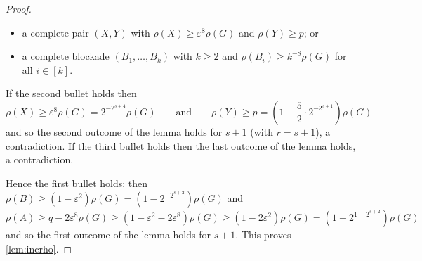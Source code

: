 \documentclass[10pt,a4paper]{amsart}
\newcommand{\eps}{\varepsilon}
\begin{document}
\begin{proof}
\begin{itemize}
			\item a complete pair $(X,Y)$ with $\rho(X)\ge \eps^8\rho(G)$ and $\rho(Y)\ge p$; or
			
			\item a complete blockade $(B_1,\ldots,B_k)$ with $k\ge2$ and $\rho(B_i)\ge k^{-8}\rho(G)$ for all $i\in[k]$.
		\end{itemize}
		
		If the second bullet holds then \[\rho(X)\ge\eps^8\rho(G)=2^{-2^{s+4}}\rho(G)
		\qquad\text{and}\qquad
		\rho(Y)\ge p=\left(1-\frac52\cdot 2^{-2^{s+1}}\right)\rho(G)\]
		and so the second outcome of the lemma holds for $s+1$ (with $r=s+1$), a contradiction.
		If the third bullet holds then the last outcome of the lemma holds, a contradiction.
		
		Hence the first bullet holds; then $\rho(B)\ge(1-\eps^2)\rho(G)=(1-2^{-2^{s+2}})\rho(G)$ and
		\[\rho(A)\ge q-2\eps^8\rho(G)\ge (1-\eps^2-2\eps^8)\rho(G)\ge(1-2\eps^2)\rho(G)
		=(1-2^{1-2^{s+2}})\rho(G)\]
		and so the first outcome of the lemma holds for $s+1$. This proves \cref{lem:incrho}.
	\end{proof}
\end{document}
